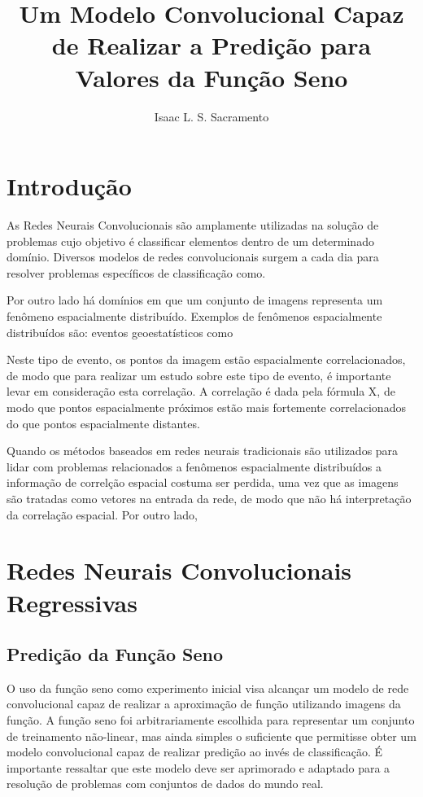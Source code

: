 \documentclass[a4paper,10pt]{report}
\title{Um Modelo Convolucional Capaz de Realizar a Predição para Valores da Função Seno}
\author{Isaac L. S. Sacramento}
\begin{document}
\maketitle

\begin{abstract}
\end{abstract}

\chapter{Introdução}

As Redes Neurais Convolucionais são amplamente utilizadas
na solução de problemas cujo objetivo é classificar elementos
dentro de um determinado domínio. Diversos modelos de redes
convolucionais surgem a cada dia para resolver problemas específicos
de classificação como.

Por outro lado há domínios em que um conjunto de imagens representa
um fenômeno espacialmente distribuído. Exemplos de fenômenos 
espacialmente distribuídos são: eventos geoestatísticos como 

Neste tipo de evento, os pontos da imagem estão espacialmente correlacionados,
de modo que para realizar um estudo sobre este tipo de evento, é
importante levar em consideração esta correlação. A correlação é dada
pela fórmula X, de modo que pontos espacialmente próximos estão mais fortemente
correlacionados do que pontos espacialmente distantes.

Quando os métodos baseados em redes neurais tradicionais são utilizados
para lidar com problemas relacionados a fenômenos espacialmente distribuídos
a informação de correlção espacial costuma ser perdida, uma vez que as imagens
são tratadas como vetores na entrada da rede, de modo que não há interpretação
da correlação espacial. Por outro lado,

\chapter{Redes Neurais Convolucionais Regressivas}

\section{Predição da Função Seno}
O uso da função seno como experimento inicial visa alcançar um modelo de
rede convolucional capaz de realizar a aproximação de função utilizando
imagens da função. A função seno foi arbitrariamente escolhida para
representar um conjunto de treinamento não-linear, mas ainda simples o
suficiente que permitisse obter um modelo convolucional capaz de realizar predição
ao invés de classificação. É importante ressaltar que este modelo deve ser
aprimorado e adaptado para a resolução de problemas com conjuntos de dados
do mundo real.
\end{document}
